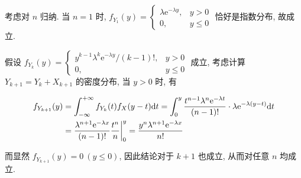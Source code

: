 \documentclass[8pt]{article}
\theoremstyle{compact}
\def\le{\leqslant}
\def\e{\mathrm{e}}
\begin{document}
\section{}
考虑对 $n$ 归纳. 当 $n = 1$ 时, $f_{Y_1}(y) = \begin{cases}
	\lambda\e^{-\lambda y}, & y > 0\\
	0, & y \le 0
\end{cases}$ 恰好是指数分布, 故成立.

假设 $f_{Y_k}(y) = \begin{cases}
	y^{k-1}\lambda^k\e^{-\lambda y} / (k-1)!, & y > 0\\
	0, & y \le 0
\end{cases}$ 成立, 考虑计算$Y_{k+1} = Y_k + X_{k+1}$ 的密度分布, 当 $y > 0$ 时, 有

\begin{equation}
	\begin{split}
		f_{Y_{k+1}}(y) &= \int_{-\infty}^{+\infty}f_{Y_k}(t)f_{X}(y-t)\text dt = \int_{0}^{y}\frac{t^{n-1}\lambda^n\e^{-\lambda t}}{(n-1)!}\cdot \lambda \e^{-\lambda(y-t)}\text dt\\
		&= \frac{\lambda^{n+1}\e^{-\lambda x}}{(n-1)!} \frac{t^n}{n}\bigg|_{0}^{y} = \frac{y^n\lambda^{n+1}\e^{-\lambda x}}{n!}
	\end{split}
\end{equation}

而显然 $f_{Y_{k + 1}}(y) = 0 \ (y \le 0)$, 因此结论对于 $k+1$ 也成立, 从而对任意 $n$ 均成立.

\section{}

\subsection{}
\end{document}
